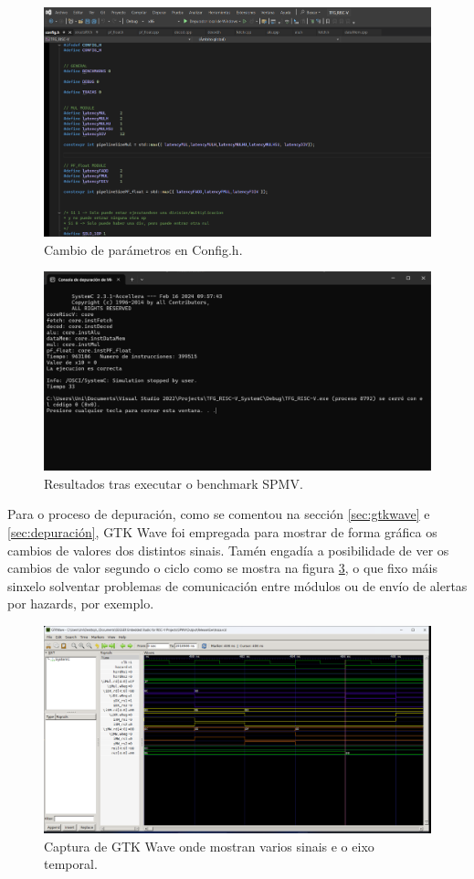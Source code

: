 \begin{figure}[hp!]
  \centering
  \includegraphics[width=\textwidth]{imaxes/Cap_5_Config.png}
  \caption{Cambio de parámetros en Config.h.}
  \label{fig:parametros}
\end{figure}

\begin{figure}[hp!]
  \centering
  \includegraphics[width=\textwidth]{imaxes/Cap_res_final.png}
  \caption{Resultados tras executar o benchmark SPMV.}
  \label{fig:resultados}
\end{figure}

Para o proceso de depuración, como se comentou na sección \ref{sec:gtkwave} e \ref{sec:depuración}, GTK Wave foi empregada para mostrar de forma gráfica os cambios de valores dos distintos sinais. Tamén engadía a posibilidade de ver os cambios de valor segundo o ciclo como se mostra na figura \ref{fig:gtkwave}, o que fixo máis sinxelo solventar problemas de comunicación entre módulos ou de envío de alertas por hazards, por exemplo.

\begin{figure}[hp!]
  \centering
  \includegraphics[width=\textwidth]{imaxes/Cap_gtkwave.png}
  \caption{Captura de GTK Wave onde mostran varios sinais e o eixo temporal.}
  \label{fig:gtkwave}
\end{figure}

